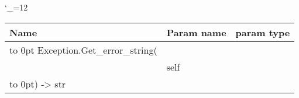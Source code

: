 \begingroup \catcode`\_=12 \tt
\begin{tabular}{lll}
\toprule
\textrm{Name}&\textrm{Param name}&\textrm{param type}\\
\midrule
\hbox to 0pt {Exception.Get_error_string(\hss}\\
& self\\
\hbox to 0pt{) -> str\hss}\\
\bottomrule
\end{tabular}
\endgroup
